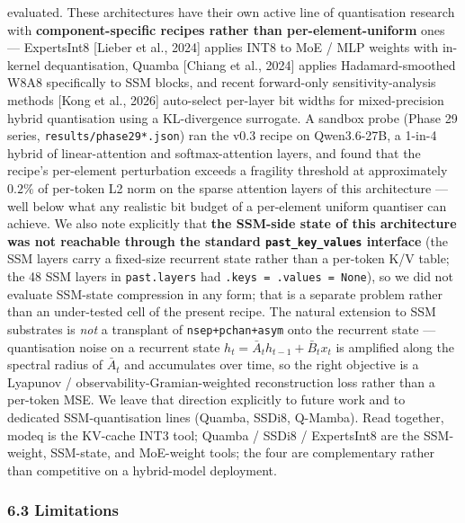evaluated. These architectures have their own active line of
quantisation research with \textbf{component-specific recipes rather
than per-element-uniform} ones --- ExpertsInt8 {[}Lieber et al., 2024{]}
applies INT8 to MoE / MLP weights with in-kernel dequantisation, Quamba
{[}Chiang et al., 2024{]} applies Hadamard-smoothed W8A8 specifically to
SSM blocks, and recent forward-only sensitivity-analysis methods {[}Kong
et al., 2026{]} auto-select per-layer bit widths for mixed-precision
hybrid quantisation using a KL-divergence surrogate. A sandbox probe
(Phase 29 series, \texttt{results/phase29*.json}) ran the v0.3 recipe on
Qwen3.6-27B, a 1-in-4 hybrid of linear-attention and softmax-attention
layers, and found that the recipe's per-element perturbation exceeds a
fragility threshold at approximately \(0.2 \%\) of per-token L2 norm on
the sparse attention layers of this architecture --- well below what any
realistic bit budget of a per-element uniform quantiser can achieve. We
also note explicitly that \textbf{the SSM-side state of this
architecture was not reachable through the standard
\texttt{past\_key\_values} interface} (the SSM layers carry a fixed-size
recurrent state rather than a per-token K/V table; the 48 SSM layers in
\texttt{past.layers} had \texttt{.keys\ =\ .values\ =\ None}), so we did
not evaluate SSM-state compression in any form; that is a separate
problem rather than an under-tested cell of the present recipe. The
natural extension to SSM substrates is \emph{not} a transplant of
\texttt{nsep+pchan+asym} onto the recurrent state --- quantisation noise
on a recurrent state \(h_t = \bar A_t h_{t-1} + \bar B_t x_t\) is
amplified along the spectral radius of \(\bar A_t\) and accumulates over
time, so the right objective is a Lyapunov /
observability-Gramian-weighted reconstruction loss rather than a
per-token MSE. We leave that direction explicitly to future work and to
dedicated SSM-quantisation lines (Quamba, SSDi8, Q-Mamba). Read
together, modeq is the KV-cache INT3 tool; Quamba / SSDi8 / ExpertsInt8
are the SSM-weight, SSM-state, and MoE-weight tools; the four are
complementary rather than competitive on a hybrid-model deployment.

\subsubsection{6.3 Limitations}\label{limitations}

